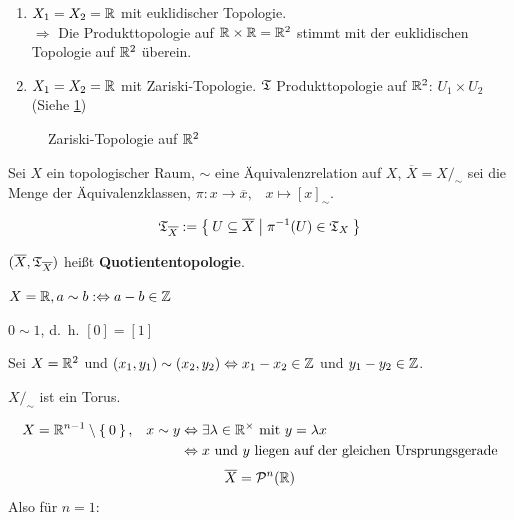 \begin{beispiel}
    \begin{enumerate}[label=\arabic*)]
        \item $X_1 = X_2 = \mathbb{R}$ mit euklidischer Topologie.\\
              $\Rightarrow$ Die Produkttopologie auf $\mathbb{R} \times \mathbb{R} = \mathbb{R}^2$
              stimmt mit der euklidischen Topologie auf $\mathbb{R}^2$ überein.
        \item $X_1 = X_2 = \mathbb{R}$ mit Zariski-Topologie.
              $\mathfrak{T}$ Produkttopologie auf $\mathbb{R}^2$: $U_1 \times U_2$\\
              (Siehe \cref{fig:zariski-topologie})
    \end{enumerate}

    \begin{figure}[htp]
        \centering
        
        \caption{Zariski-Topologie auf $\mathbb{R}^2$}
        \label{fig:zariski-topologie}
    \end{figure}
\end{beispiel}

\begin{definition} 
    Sei $X$ ein topologischer Raum, $\sim$ eine Äquivalenzrelation auf $X$,
    $\overline{X} = X /_\sim$ sei die Menge der Äquivalenzklassen,
    $\pi: x \rightarrow \overline{x}, \;\;\; x \mapsto [x]_\sim$.

    \[\mathfrak{T}_{\overline{X}} := \Set{U \subseteq \overline{X} | \pi^{-1}(U) \in \mathfrak{T}_X}\]

    $(\overline{X}, \mathfrak{T}_{\overline{X}})$ heißt \textbf{Quotiententopologie}.
\end{definition}

\begin{beispiel}
    $X = \mathbb{R}, a \sim b :\Leftrightarrow a-b \in \mathbb{Z}$
    
    

    $0 \sim 1$, d.~h. $[0] = [1]$
\end{beispiel}

\begin{beispiel}
    Sei $X = \mathbb{R}^2$ und $(x_1, y_1) \sim (x_2, y_2) \Leftrightarrow x_1 - x_2 \in \mathbb{Z}$ 
    und $y_1 - y_2 \in \mathbb{Z}$.

    $X /_\sim$ ist ein Torus.
\end{beispiel}

\begin{beispiel}
    \begin{align*}
        X= \mathbb{R}^{n-1} \setminus \Set{0},\;\;\; x \sim y &\Leftrightarrow \exists \lambda \in \mathbb{R}^\times \text{ mit } y = \lambda x\\
            &\Leftrightarrow x \text{ und } y \text{ liegen auf der gleichen Ursprungsgerade}
    \end{align*}
    \[\overline{X} = \mathcal{P}^n(\mathbb{R})\]
    Also für $n=1$:\nopagebreak\\
    
\end{beispiel}

